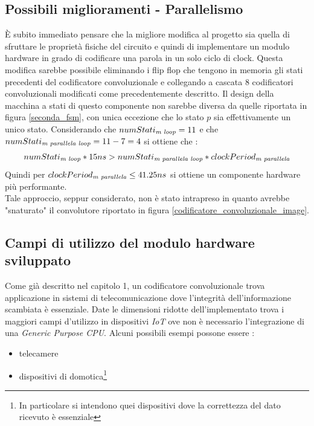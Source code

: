 \documentclass[11pt,a4paper]{article}
\begin{document}
        \subsection{Possibili miglioramenti - Parallelismo}
            È subito immediato pensare che la migliore modifica al progetto sia quella di sfruttare le proprietà fisiche del circuito e quindi di implementare un modulo hardware in grado di codificare una parola in un solo ciclo di clock. 
            Questa modifica sarebbe possibile eliminando i flip flop che tengono in memoria gli stati precedenti del codificatore convoluzionale e collegando a cascata 8 codificatori convoluzionali modificati come precedentemente descritto.
            Il design della macchina a stati di questo componente non sarebbe diversa da quelle riportata in figura \ref{seconda_fsm}, con unica eccezione che lo stato $p$ sia effettivamente un unico stato. 
            Considerando che $numStati_{\textit{\text{m loop}}} =11$ e che $numStati_{\textit{\text{m  parallela loop}}} = 11 -7 = 4$ si ottiene che :
            \begin{gather*}
                numStati_{\textit{\text{m loop}}} * 15ns > numStati_{\textit{\text{m  parallela loop}}} * clockPeriod_{\textit{\text{m  parallela}}}
            \end{gather*}
            Quindi per $clockPeriod_{\textit{\text{m  parallela}}} \leq 41.25ns$ si ottiene un componente hardware più performante.\\
            Tale approccio, seppur considerato, non è stato intrapreso in quanto avrebbe "snaturato" il convolutore riportato in figura \ref{codificatore_convoluzionale_image}.
        \subsection{Campi di utilizzo del modulo hardware sviluppato}
            Come già  descritto nel capitolo 1, un codificatore convoluzionale trova applicazione in sistemi di telecomunicazione dove l'integrità dell'informazione scambiata è essenziale.
            Date le dimensioni ridotte dell'implementato trova i maggiori campi d'utilizzo in dispositivi \textit{IoT} ove non è necessario l'integrazione di una \textit{Generic Purpose CPU}.
            Alcuni possibili esempi possone essere :
            \begin{itemize}
                \item telecamere
                \item dispositivi di domotica\footnote[1]{In particolare si intendono quei dispositivi dove la correttezza del dato ricevuto è essenziale}
            \end{itemize}
\end{document}
